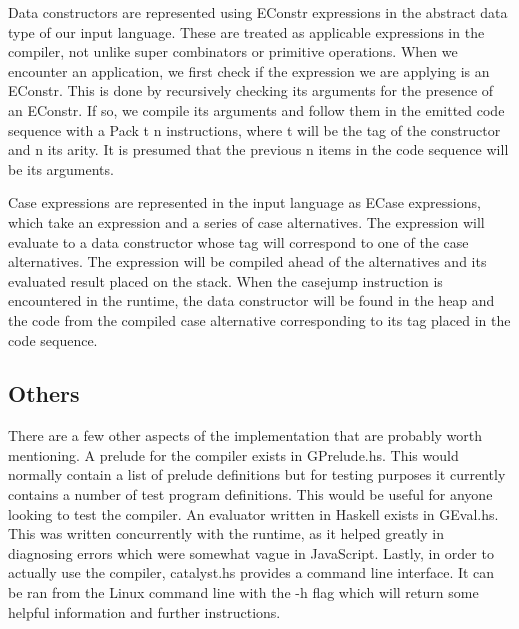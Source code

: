 Data constructors are represented using EConstr expressions in 
the abstract data type of our input language. These are treated
as applicable expressions in the compiler, not unlike super 
combinators or primitive operations. When we encounter an 
application, we first check if the expression we are applying
is an EConstr. This is done by recursively checking its arguments
for the presence of an EConstr. If so, we compile its arguments 
and follow them in the emitted code sequence with a Pack t n 
instructions, where t will be the tag of the constructor and n 
its arity. It is presumed that the previous n items in the code 
sequence will be its arguments. 

Case expressions are represented in the input language as ECase
expressions, which take an expression and a series of case 
alternatives. The expression will evaluate to a data constructor
whose tag will correspond to one of the case alternatives. The 
expression will be compiled ahead of the alternatives and its
evaluated result placed on the stack. When the casejump instruction 
is encountered in the runtime, the data constructor will be 
found in the heap and the code from the compiled case alternative
corresponding to its tag placed in the code sequence.


\subsection{Others}
There are a few other aspects of the implementation that
are probably worth mentioning. A prelude for the compiler exists
in GPrelude.hs. This would normally contain a list of prelude
definitions but for testing purposes it currently contains a 
number of test program definitions. This would be useful for
anyone looking to test the compiler.  An evaluator written in 
Haskell exists in GEval.hs. This was written concurrently with 
the runtime, as it helped greatly in diagnosing errors which 
were somewhat vague in JavaScript. Lastly, in order to actually
use the compiler, catalyst.hs provides a command line interface.
It can be ran from the Linux command line with the -h flag which
will return some helpful information and further instructions.






















